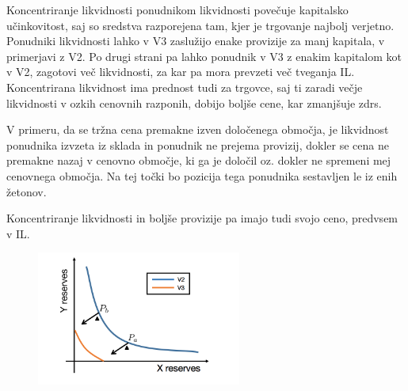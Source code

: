 \documentclass[a4paper,12pt]{article}%
\begin{document}
Koncentriranje likvidnosti ponudnikom likvidnosti povečuje kapitalsko učinkovitost, saj so sredstva razporejena tam, kjer je trgovanje najbolj verjetno. Ponudniki likvidnosti lahko v V3 zaslužijo enake provizije za manj kapitala, v primerjavi z V2. 
Po drugi strani pa lahko ponudnik v V3 z enakim kapitalom kot v V2, zagotovi več likvidnosti, za kar pa mora prevzeti več tveganja IL. 
Koncentrirana likvidnost ima prednost tudi za trgovce, saj ti zaradi večje likvidnosti v ozkih cenovnih razponih, dobijo boljše cene, kar zmanjšuje zdrs.  


V primeru, da se tržna cena premakne izven določenega območja, je likvidnost ponudnika izvzeta iz sklada in ponudnik ne prejema provizij, dokler se cena ne premakne nazaj v cenovno območje, ki ga je določil oz. dokler ne spremeni mej cenovnega območja. Na tej točki bo pozicija tega ponudnika sestavljen le iz enih žetonov. 

Koncentriranje likvidnosti in boljše provizije pa imajo tudi svojo ceno, predvsem v IL. 




\begin{figure}[!ht]
    \centering
    \includegraphics[width=0.6\textwidth]{krivulja.png}
\end{figure}
\end{document}
